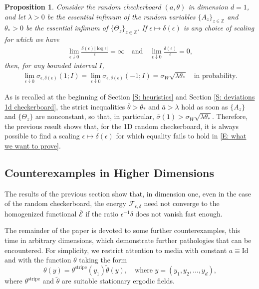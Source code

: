 \documentclass[12pt]{amsart}
\newtheorem{prop}{Proposition}
\begin{document}
	\begin{prop}\label{P: deviations 1d checkerboard}
	Consider the random checkerboard $(a,\theta)$ in dimension $d = 1$, and let $\lambda > 0$ be the essential infimum of the random variables $\{A_{z}\}_{z \in \mathbb{Z}}$ and $\theta_{*} > 0$ be the essential infimum of $\{ \Theta_{z} \}_{z \in \mathbb{Z}}$.  If $\epsilon \mapsto \delta(\epsilon)$ is any choice of scaling for which we have
		\begin{align*}
			\lim_{\epsilon \downarrow 0} \frac{ \delta(\epsilon) | \log \epsilon | }{ \epsilon } = \infty \quad \text{and} \quad \lim_{\epsilon \downarrow 0} \frac{ \delta(\epsilon) }{ \epsilon } = 0,
		\end{align*}
	then, for any bounded interval $I$,
		\begin{align*}
			\lim_{ \epsilon \downarrow 0 } \sigma_{\epsilon,\delta(\epsilon)} ( 1 ; I ) = \lim_{ \epsilon \downarrow 0 }  \sigma_{\epsilon,\delta(\epsilon)} ( -1 ; I ) = \sigma_{W} \sqrt{ \lambda \theta_{*} } \quad \text{in probability.}
		\end{align*}
	\end{prop}
		
As is recalled at the beginning of Section \ref{S: heuristics} and Section \ref{S: deviations 1d checkerboard}, the strict inequalities $\bar{\theta} > \theta_{*}$ and $\bar{a} > \lambda$ hold as soon as $\{A_{z}\}$ and $\{\Theta_{z}\}$ are nonconstant, so that, in particular, $\bar{\sigma}(1) > \sigma_{W} \sqrt{ \lambda \theta_{*} }$.  Therefore, the previous result shows that, for the 1D random checkerboard, it is always possible to find a scaling $\epsilon \mapsto \delta(\epsilon)$ for which equality fails to hold in \eqref{E: what we want to prove}.
	
\subsection{Counterexamples in Higher Dimensions} The results of the previous section show that, in dimension one, even in the case of the random checkerboard, the energy $\mathscr{F}_{\epsilon,\delta}$ need not converge to the homogenized functional $\bar{\mathscr{E}}$ if the ratio $\epsilon^{-1} \delta$ does not vanish fast enough.  

The remainder of the paper is devoted to some further counterexamples, this time in arbitrary dimensions, which demonstrate further pathologies that can be encountered. For simplicity, we restrict attention to media with constant $a \equiv \text{Id}$ and with the function $\theta$ taking the form
	\begin{equation} \label{E: quasi one dimensional}
		\theta(y) = \theta^{\text{stripe}}(y_{1}) \tilde{\theta}(y), \quad \text{where} \, \, y = (y_{1},y_{2},\dots,y_{d}),
	\end{equation}
where $\theta^{\text{stripe}}$ and $\tilde{\theta}$ are suitable stationary ergodic fields.
\end{document}
